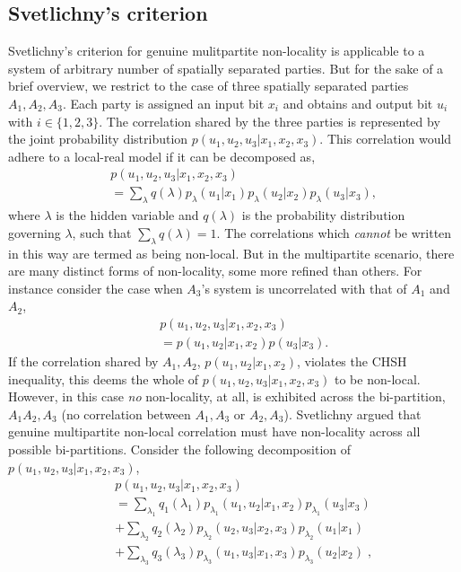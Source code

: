 \documentclass[%
 reprint,
 amsmath,amssymb,
 aps,
]{revtex4-1}
\theoremstyle{plain}
\begin{document}
\subsection{Svetlichny's criterion} 
Svetlichny's criterion for genuine mulitpartite non-locality is applicable to a system of arbitrary number of spatially separated parties. But for the sake of a brief overview, we restrict to the case of three spatially separated parties $A_1,A_2,A_3$. Each party is assigned an input bit $x_i$ and obtains and output bit $u_i$ with $i \in \{1,2,3\}$. The correlation shared by the three parties is represented by the joint probability distribution $p(u_1,u_2,u_3|x_1,x_2,x_3)$.
This correlation would adhere to a local-real model if it can be decomposed as,
\begin{eqnarray} \label{ML}
&&p(u_1,u_2,u_3|x_1,x_2,x_3) \nonumber \\&&= \sum_{\lambda} q(\lambda) p_{\lambda}(u_1|x_1)p_{\lambda}(u_2|x_2)p_{\lambda}(u_3|x_3),
\end{eqnarray}
 where $\lambda$ is the hidden variable and $q(\lambda)$ is the probability distribution governing $\lambda$, such that
$\sum_\lambda q(\lambda) = 1$. The correlations which \textit{cannot} be written in this way are termed as being non-local. But in the multipartite scenario, there are many distinct forms of non-locality, some more refined than others. For instance consider the case when $A_3$'s system is uncorrelated with that of $A_1$ and $A_2$,
\begin{eqnarray}
&&p(u_1,u_2,u_3|x_1,x_2,x_3) \nonumber \\ &&= p(u_1,u_2|x_1,x_2)p(u_3|x_3). 
\end{eqnarray} 
If the correlation shared by $A_1,A_2$, $p(u_1,u_2|x_1,x_2)$, violates the CHSH inequality, this deems the whole of $p(u_1,u_2,u_3|x_1,x_2,x_3)$ to be non-local. However, in this case \textit{no} non-locality, at all, is exhibited across the bi-partition, $A_1A_2,A_3$ (no correlation between $A_1,A_3$ or $A_2,A_3$). Svetlichny argued that genuine multipartite non-local correlation must have non-locality across all possible bi-partitions. Consider the following decomposition of $p(u_1,u_2,u_3|x_1,x_2,x_3)$,
\begin{eqnarray}\label{SL}
&&p(u_1,u_2,u_3|x_1,x_2,x_3){}\nonumber\\&& =  \sum_{\lambda_1} q_1(\lambda_1)p_{\lambda_1}(u_1,u_2|x_1,x_2)p_{\lambda_1}(u_3|x_3) {}\nonumber\\&&
           +  \sum_{\lambda_2} q_2({\lambda_2})p_{\lambda_2}(u_2,u_3|x_2,x_3)p_{\lambda_2}(u_1|x_1) {}\nonumber\\&& 
           +  \sum_{\lambda_3} q_3({\lambda_3})p_{\lambda_3}(u_1,u_3|x_1,x_3)p_{\lambda_3}(u_2|x_2) \; ,
\end{eqnarray}
\end{document}
